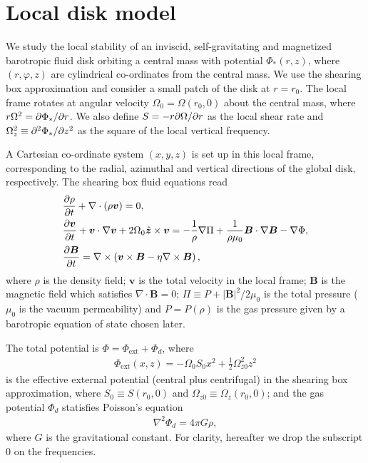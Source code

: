 \section{Local disk model}
We study the local stability of an inviscid, self-gravitating and
magnetized barotropic fluid disk orbiting a central mass with
potential $\Phi_*(r,z)$, where $(r,\varphi,z)$ are cylindrical
co-ordinates from the central mass. We use the shearing box approximation     
\citep{goldreich65b} and consider a small patch of the disk at
$r=r_0$. The local frame rotates at angular velocity 
$\Omega_0=\Omega(r_0,0)$ about the central mass, where $r\Omega^2 =
\partial\Phi_*/\partial r$. We also define $S=-r\partial\Omega/\partial r$ as the local shear
rate and $\Omega_z^2\equiv\partial^2\Phi_*/\partial z^2$ as the square of the
local vertical frequency. 

A Cartesian co-ordinate system $(x,y,z)$ is set
up in this local frame, corresponding to the radial, azimuthal and vertical
directions of the global disk, respectively. The shearing box fluid
equations read 
\begin{align} 
  &\frac{\partial\rho}{\partial t}+\nabla\cdot(\rho\bm{v}) = 0,\\
  &\frac{\partial \bm{v}}{\partial t} + \bm{v}\cdot\nabla\bm{v} +
  2\Omega_0\hat{\bm{z}}\times\bm{v} = - \frac{1}{\rho}\nabla\Pi +
  \frac{1}{\rho\mu_0}\bm{B}\cdot\nabla\bm{B}
  -\nabla\Phi,\\
  &\frac{\partial\bm{B}}{\partial t}= \nabla\times\left(\bm{v}\times\bm{B} -
  \eta\nabla\times\bm{B}\right), 
\end{align}
where $\rho$ is the density field; $\bm{v}$ is the total velocity in
the local frame; $\bm{B}$ is the magnetic field which satisfies
$\nabla\cdot\bm{B}=0$; $\Pi \equiv P +
|\bm{B}|^2/2\mu_0$ is the total pressure ($\mu_0$ is the vacuum
permeability) and $P=P(\rho)$ is the gas pressure given by a
barotropic equation of state chosen later.  

The total potential is $\Phi = \Phi_\mathrm{ext} + \Phi_d$, where
\begin{align}
  \Phi_\mathrm{ext}(x,z) = -\Omega_0 S_0 x^2 +
  \frac{1}{2}\Omega_{z0}^2z^2 
\end{align}
is the effective external potential (central plus centrifugal) in the
shearing box approximation, where $S_0\equiv S(r_0,0)$ and
$\Omega_{z0}\equiv\Omega_z(r_0,0)$; 
and the gas potential $\Phi_d$ statisfies Poisson's equation
\begin{align}
  \nabla^2\Phi_d = 4\pi G \rho, 
\end{align}
where $G$ is the gravitational constant. For clarity, hereafter we
drop the subscript $0$ on the frequencies. 

